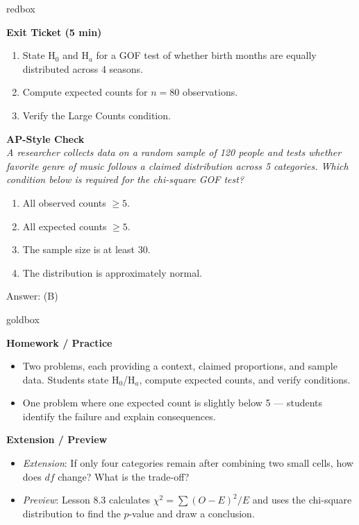 \documentclass[10pt]{article}
\begin{document}
\begin{skillbox}{redbox}
\begin{minipage}[t]{0.48\linewidth}
    \textbf{Exit Ticket (5 min)}
    \begin{enumerate}
        \item State H$_0$ and H$_a$ for a GOF test of whether birth months are equally
              distributed across 4 seasons.
        \item Compute expected counts for $n = 80$ observations.
        \item Verify the Large Counts condition.
    \end{enumerate}
\end{minipage}
\hfill
\begin{minipage}[t]{0.48\linewidth}
    \textbf{AP-Style Check}\\
    \textit{A researcher collects data on a random sample of 120 people and tests
    whether favorite genre of music follows a claimed distribution across 5 categories.
    Which condition below is required for the chi-square GOF test?}
    \begin{enumerate}[label=(\Alph*)]
        \item All observed counts $\ge 5$.
        \item All expected counts $\ge 5$.
        \item The sample size is at least 30.
        \item The distribution is approximately normal.
    \end{enumerate}
    Answer: (B)
\end{minipage}
\end{skillbox}

\begin{skillbox}{goldbox}
\begin{minipage}[t]{0.48\linewidth}
    \textbf{Homework / Practice}
    \begin{itemize}
        \item Two problems, each providing a context, claimed proportions, and sample
              data. Students state H$_0$/H$_a$, compute expected counts, and verify
              conditions.
        \item One problem where one expected count is slightly below 5 --- students
              identify the failure and explain consequences.
    \end{itemize}
\end{minipage}
\hfill
\begin{minipage}[t]{0.48\linewidth}
    \textbf{Extension / Preview}
    \begin{itemize}
        \item \textit{Extension}: If only four categories remain after combining two
              small cells, how does $df$ change? What is the trade-off?
        \item \textit{Preview}: Lesson 8.3 calculates $\chi^2 = \sum (O-E)^2/E$ and
              uses the chi-square distribution to find the $p$-value and draw a
              conclusion.
    \end{itemize}
\end{minipage}
\end{skillbox}
\end{document}
